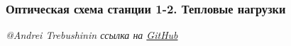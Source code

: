 \documentclass[14pt, hyperref = {colorlinks},xcolor=table ]{beamer}
\begin{document}
\begin{frame}
\end{frame}

\small
\begin{frame}
\frametitle{Оптическая схема станции 1-2. Тепловые нагрузки}\label{t1}
\vspace{-20pt}
\begin{figure}[h]
\end{figure}
\vspace{-15pt}
\begin{figure}[h]
\end{figure}
\tiny{\textit{@Andrei Trebushinin ссылка на \href{https://github.com/TrebAndrew/thesis_andrei.git}{GitHub}}}
\end{frame}
\end{document}
